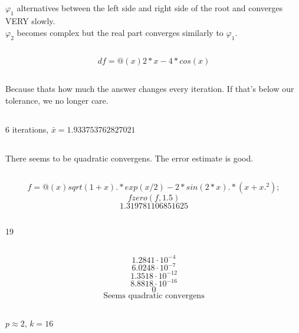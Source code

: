 \documentclass[12pt]{article}
\begin{document}
\subsection{}
$\varphi_1$ alternatives between the left side and right side of the root and converges VERY slowly. \\
$\varphi_2$ becomes complex but the real part converges similarly to $\varphi_1$.

\subsection{}
$$df=@(x) 2*x - 4*cos(x)$$

\subsection{}
Because thats how much the answer changes every iteration. If that's below our tolerance, we no longer care.

\subsection{}
6 iterations, $\bar{x}= 1.933753762827021$

\subsection{}
There seems to be quadratic convergens. The error estimate is good.

\subsection{}
$$f = @(x) sqrt(1+x).*exp(x/2)-2*sin(2*x).*(x+x.^2);$$
$$fzero(f, 1.5)$$
$$1.319781106851625$$

\subsection{}
19

\subsection{}
$$1.2841\cdot 10^{-4}$$
$$6.0248\cdot 10^{-7}$$
$$1.3518\cdot 10^{-12}$$
$$8.8818\cdot 10^{-16}$$
$$0$$
$$\text{Seems quadratic convergens}$$

\subsection{}
$p\approx 2$, $k=16$
\end{document}
